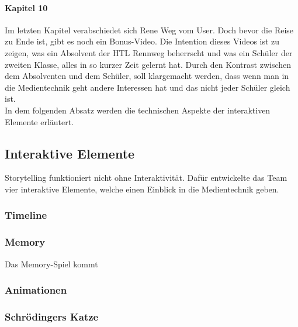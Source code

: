 \paragraph{Kapitel 10}
Im letzten Kapitel verabschiedet sich Rene Weg vom User. Doch bevor die Reise zu Ende ist, gibt es noch ein Bonus-Video. Die Intention dieses Videos ist zu zeigen, was ein Absolvent der HTL Rennweg beherrscht und was ein Schüler der zweiten Klasse, alles in so kurzer Zeit gelernt hat. Durch den Kontrast zwischen dem Absolventen und dem Schüler, soll klargemacht werden, dass wenn man in die Medientechnik geht andere Interessen hat und das nicht jeder Schüler gleich ist.\\
In dem folgenden Absatz werden die technischen Aspekte der interaktiven Elemente erläutert.

\subsection{Interaktive Elemente}
Storytelling funktioniert nicht ohne Interaktivität.  Dafür entwickelte das Team vier interaktive Elemente, welche einen Einblick in die Medientechnik geben. 
\subsubsection{Timeline}

\subsubsection{Memory}
Das Memory-Spiel kommt 

\subsubsection{Animationen}

\subsubsection{Schrödingers Katze}


